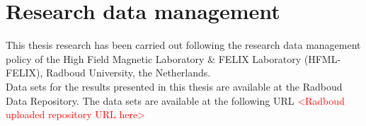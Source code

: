 \chapter{Research data management}

This thesis research has been carried out following the research data management policy of the High Field Magnetic Laboratory \& FELIX Laboratory (HFML-FELIX), Radboud University, the Netherlands.\\

Data sets for the results presented in this thesis are available at the Radboud Data Repository. The data sets are available at the following URL \textcolor{red}{<Radboud uploaded repository URL here>}
